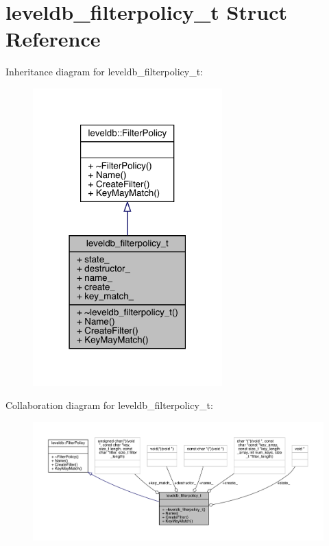 \hypertarget{structleveldb__filterpolicy__t}{}\section{leveldb\+\_\+filterpolicy\+\_\+t Struct Reference}
\label{structleveldb__filterpolicy__t}


Inheritance diagram for leveldb\+\_\+filterpolicy\+\_\+t\+:
\nopagebreak
\begin{figure}[H]
\begin{center}
\leavevmode
\includegraphics[width=207pt]{structleveldb__filterpolicy__t__inherit__graph}
\end{center}
\end{figure}


Collaboration diagram for leveldb\+\_\+filterpolicy\+\_\+t\+:
\nopagebreak
\begin{figure}[H]
\begin{center}
\leavevmode
\includegraphics[width=350pt]{structleveldb__filterpolicy__t__coll__graph}
\end{center}
\end{figure}
